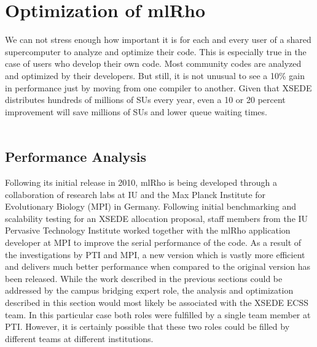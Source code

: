 \documentclass{sig-alternate}
\begin{document}
\section{Optimization of mlRho}\label{sec:optimization}
We can not stress enough how important it is for each and every user of a shared supercomputer to analyze and optimize their code. This is especially true in the case of users who develop their own code. Most community codes are analyzed and optimized by their developers. But still, it is not unusual to see a 10\% gain in performance just by moving from one compiler to another. Given that XSEDE distributes hundreds of millions of SUs every year, even a 10 or 20 percent improvement will save millions of SUs and lower queue waiting times. 
\\
\\

\subsection{Performance Analysis}\label{subsec:analysis}
Following its initial release in 2010\cite{MEC:MEC4482}, mlRho is being developed through a collaboration
 of research labs at IU and the Max Planck Institute for Evolutionary Biology (MPI) in Germany.
 Following initial benchmarking and scalability
testing for an XSEDE allocation proposal, staff members from the IU Pervasive Technology Institute worked
together with the mlRho application developer at MPI to improve the serial performance of the code. As a result of the investigations by PTI and MPI,  a new version which is vastly more efficient and delivers much better performance when compared to
the original version has been released. While the work described in the previous sections could be addressed by the campus
bridging expert role, the analysis and optimization described in this section would most likely be associated with
the XSEDE ECSS team. In this particular case both roles were fulfilled by a single team member at PTI. However,
it is certainly possible that these two roles could be filled by different teams at different institutions.
\end{document}
